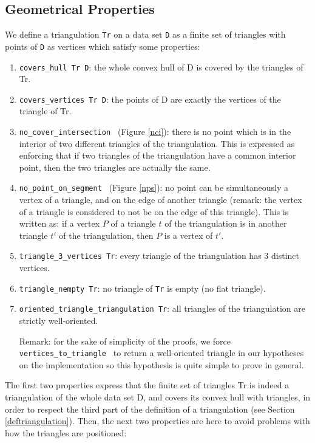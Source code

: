 \documentclass[a4paper,10pt]{article}
\def\ttt#1#2{{\tt{\color{black}#1} #2}}
\begin{document}
\subsection{Geometrical Properties}
\label{definition_triangulation}
We define a triangulation {\tt Tr} on a data set {\tt D} as a finite set of triangles with points of {\tt D} as vertices which satisfy some properties:
\begin{enumerate}
\item \ttt{covers\_hull}{Tr D}: the whole convex hull of D is covered by the triangles of Tr.
\item \ttt{covers\_vertices}{Tr D}: the points of D are exactly the vertices of the triangle of Tr.
\item \ttt{no\_cover\_intersection}{} (Figure \ref{nci}): there is no point which is in the interior of two different triangles of the triangulation. This is expressed as enforcing that if two triangles of the triangulation have a common interior point, then the two triangles are actually the same.
  \item\ttt{no\_point\_on\_segment}{} (Figure \ref{nps}): no point can be simultaneously a vertex of a triangle, and on the edge of another triangle (remark: the vertex of a triangle is considered to not be on the edge of this triangle). This is written as: if a vertex $P$ of a triangle $t$ of the triangulation is in another triangle $t'$ of the triangulation, then $P$ is a vertex of $t'$.
\item \ttt{triangle\_3\_vertices}{Tr}: every triangle of the triangulation has 3 distinct vertices.
\item \ttt{triangle\_nempty}{Tr}: no triangle of {\tt Tr} is empty (no flat triangle).
\item \ttt{oriented\_triangle\_triangulation}{Tr}: all triangles of the triangulation are strictly well-oriented.

  Remark: for the sake of simplicity of the proofs, we force \ttt{vertices\_to\_triangle}{} to return a well-oriented triangle in our hypotheses on the implementation so this hypothesis is quite simple to prove in general.
\end{enumerate}
The first two properties express that the finite set of triangles Tr is indeed a triangulation of the whole data set D, and covers its convex hull with triangles, in order to respect the third part of the definition of a triangulation (see Section \ref{deftriangulation}).
Then, the next two properties are here to avoid problems with how the triangles are positioned: 
\end{document}
